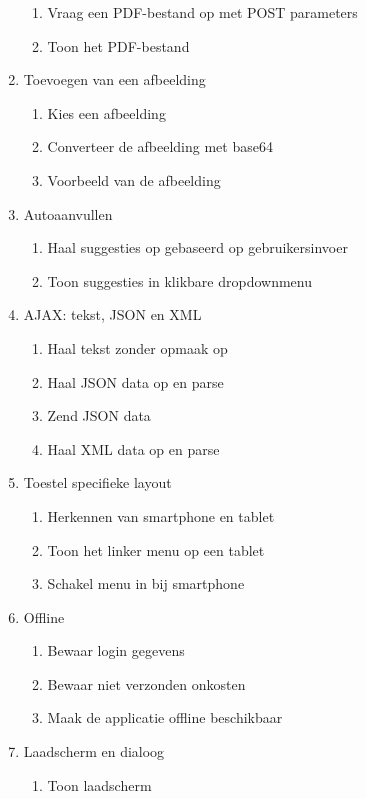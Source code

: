 \begin{enumerate}[label*=U \arabic*.]
\begin{enumerate}
\item Vraag een PDF-bestand op met POST parameters
\item Toon het PDF-bestand
\end{enumerate}
\item \label{challenge:afbeelding}Toevoegen van een afbeelding
\begin{enumerate}
\item Kies een afbeelding
\item Converteer de afbeelding met base64
\item Voorbeeld van de afbeelding
\end{enumerate}
\item \label{challenge:autoaanvullen}Autoaanvullen
\begin{enumerate}
\item Haal suggesties op gebaseerd op gebruikersinvoer
\item Toon suggesties in klikbare dropdownmenu
\end{enumerate}
\item \label{challenge:ajax}AJAX: tekst, JSON en XML
\begin{enumerate}
\item Haal tekst zonder opmaak op
\item Haal JSON data op en parse
\item Zend JSON data
\item Haal XML data op en parse
\end{enumerate}
\item \label{challenge:toestel}Toestel specifieke layout
\begin{enumerate}
\item Herkennen van smartphone en tablet
\item Toon het linker menu op een tablet
\item Schakel menu in bij smartphone
\end{enumerate}
\item \label{challenge:offline}Offline
\begin{enumerate}
\item Bewaar login gegevens
\item Bewaar niet verzonden onkosten
\item Maak de applicatie offline beschikbaar
\end{enumerate}
\item \label{challenge:laadscherm}Laadscherm en dialoog
\begin{enumerate}
\item Toon laadscherm

\end{enumerate}
\end{enumerate}
